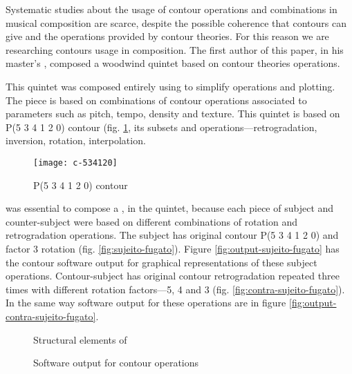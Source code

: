 Systematic studies about the usage of contour operations and
combinations in musical composition are scarce, despite the possible
coherence that contours can give and the operations provided by
contour theories. For this reason we are researching contours usage in
composition. The first author of this paper, in his master's
\cite{sampaio08:em}, composed a woodwind quintet based on contour
theories operations.

This quintet was composed entirely using \goiaba{} to simplify
operations and plotting. The piece is based on combinations of contour
operations associated to parameters such as pitch, tempo, density and
texture. This quintet is based on P(5 3 4 1 2 0) contour
(fig. \ref{fig:c-534120}, its subsets and operations---retrogradation,
inversion, rotation, interpolation.

\begin{figure}
  \centering
  \texttt{[image: c-534120]}
  \caption{P(5 3 4 1 2 0) contour}
  \label{fig:c-534120}
\end{figure}

\goiaba{} was essential to compose a , in the quintet,
because each piece of subject and counter-subject were based on
different combinations of rotation and retrogradation operations.  The
subject has original contour P(5 3 4 1 2 0) and factor 3 rotation
(fig. \ref{fig:sujeito-fugato}). Figure
\ref{fig:output-sujeito-fugato} has the contour software output for
graphical representations of these subject operations. Contour-subject
has original contour retrogradation repeated three times with
different rotation factors---5, 4 and 3
(fig. \ref{fig:contra-sujeito-fugato}). In the same way software
output for these operations are in figure
\ref{fig:output-contra-sujeito-fugato}.

\begin{figure*}
  \centering

  \caption{Structural elements of }
  \label{fig:elementos-fugato}
\end{figure*}

\begin{figure*}
  \centering
  \caption{Software output for  contour operations}
  \label{fig:output-fugato}
\end{figure*}


